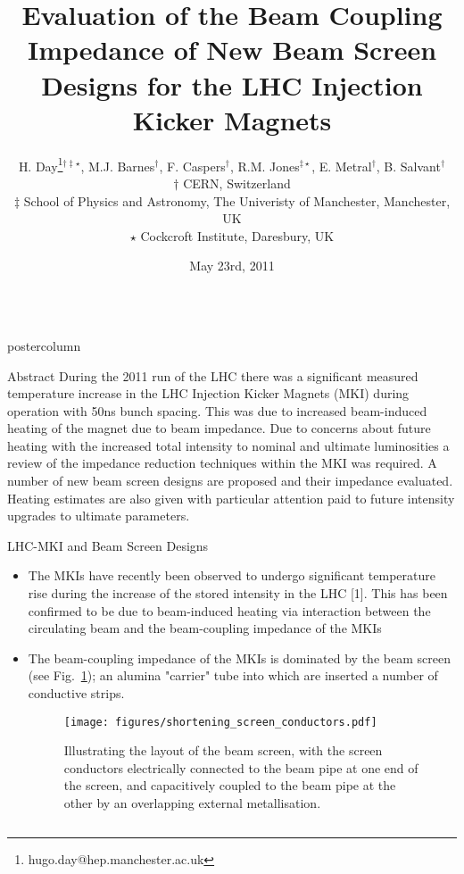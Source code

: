 \documentclass[final,hyperref={pdfpagelabels=false}]{beamer}
\title{	Evaluation of the Beam Coupling Impedance of New Beam Screen Designs for the LHC Injection Kicker Magnets}
\author{H. Day\thanks{hugo.day@hep.manchester.ac.uk}$^{\dagger\ddagger\star}$, M.J. Barnes$^{\dagger}$, F. Caspers$^{\dagger}$, R.M. Jones$^{\ddagger \star}$, E. Metral$^{\dagger}$, B. Salvant$^{\dagger}$ \\
$\dagger$ CERN, Switzerland \\
$\ddagger$ School of Physics and Astronomy, The Univeristy of Manchester, Manchester, UK \\
$\star$ Cockcroft Institute, Daresbury, UK \\}
\date[May 23rd, 2011]{May 23rd, 2011}
\newlength{\columnheight}
\begin{document}
\begin{frame}
  \begin{columns}
    \begin{column}{.49\textwidth}
      \begin{beamercolorbox}[center,wd=\textwidth]{postercolumn}
        \begin{minipage}[T]{.95\textwidth}  %
          \parbox[t][\columnheight]{\textwidth}{ %
            \begin{block}{Abstract}
\small{
During the 2011 run of the LHC there was a significant measured temperature increase in the LHC Injection Kicker Magnets (MKI) during operation with 50ns bunch spacing. This was due to increased beam-induced heating of the magnet due to beam impedance. Due to concerns about future heating with the increased total intensity to nominal and ultimate luminosities a review of the impedance reduction techniques within the MKI was required. A number of new beam screen designs are proposed and their impedance evaluated. Heating estimates are also given with particular attention paid to future intensity upgrades to ultimate parameters.
}
\end{block}
            \vfill

	\begin{block}{LHC-MKI and Beam Screen Designs}

	\begin{itemize}
	\item{The MKIs have recently been observed to undergo significant temperature rise during the increase of the stored intensity in the LHC [1]. This has been confirmed to be due to beam-induced heating via interaction between the circulating beam and the beam-coupling impedance of the MKIs}
	\item{The beam-coupling impedance of the MKIs is dominated by the beam screen (see Fig.~\ref{fig:short-screens}); an alumina "carrier" tube into which are inserted a number of conductive strips.}

\begin{figure}
\texttt{[image: figures/shortening\_screen\_conductors.pdf]}
\label{fig:short-screens}
\caption{Illustrating the layout of the beam screen, with the screen conductors electrically connected to the beam pipe at one end of the screen, and capacitively coupled to the beam pipe at the other by an overlapping external metallisation.}
\end{figure}


\end{itemize}
\end{block}}
\end{minipage}
\end{beamercolorbox}
\end{column}
\end{columns}
\end{frame}
\end{document}
